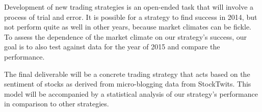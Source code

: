 Development of new trading strategies is an open-ended task that will involve a process of trial and error. It is possible for a strategy to find success in 2014, but not perform quite as well in other years, because market climates can be fickle. To assess the dependence of the market climate on our strategy's success, our goal is to also test against data for the year of 2015 and compare the performance.

The final deliverable will be a concrete trading strategy that acts based on the sentiment of stocks as derived from micro-blogging data from StockTwits. This model will be accompanied by a statistical analysis of our strategy's performance in comparison to other strategies.

